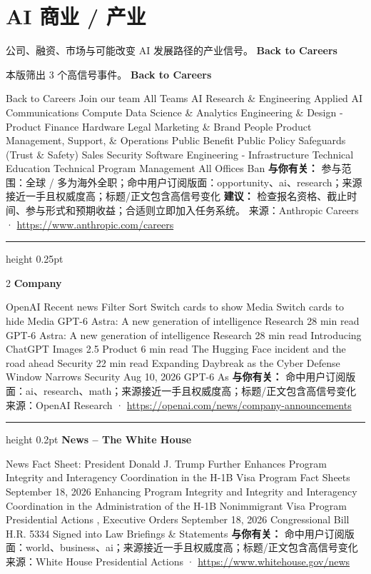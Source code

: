 \documentclass[10.5pt]{ctexart}
\begin{document}
\section*{AI 商业 / 产业}
{\color{ormuted} 公司、融资、市场与可能改变 AI 发展路径的产业信号。}
\vspace{2mm}
{\LARGE\bfseries Back to Careers}\par
\vspace{1mm}
{\color{ormuted} 本版筛出 3 个高信号事件。}
\vspace{3mm}
{\Large\bfseries Back to Careers}\par
Back to Careers Join our team All Teams AI Research \& Engineering Applied AI Communications Compute Data Science \& Analytics Engineering \& Design - Product Finance Hardware Legal Marketing \& Brand People Product Management, Support, \& Operations Public Benefit Public Policy Safeguards (Trust \& Safety) Sales Security Software Engineering - Infrastructure Technical Education Technical Program Management All Offices Ban
\textbf{与你有关：} 参与范围：全球 / 多为海外全职；命中用户订阅版面：opportunity、ai、research；来源接近一手且权威度高；标题/正文包含高信号变化
\textbf{建议：} 检查报名资格、截止时间、参与形式和预期收益；合适则立即加入任务系统。
{\footnotesize\color{ormuted} 来源：Anthropic Careers · \url{https://www.anthropic.com/careers}}
\vspace{4mm}
\hrule height 0.25pt
\vspace{3mm}
\begin{multicols}{2}
{\large\bfseries Company}\par
OpenAI Recent news Filter Sort Switch cards to show Media Switch cards to hide Media GPT-6 Astra: A new generation of intelligence Research 28 min read GPT-6 Astra: A new generation of intelligence Research 28 min read Introducing ChatGPT Images 2.5 Product 6 min read The Hugging Face incident and the road ahead Security 22 min read Expanding Daybreak as the Cyber Defense Window Narrows Security Aug 10, 2026 GPT-6 As
\textbf{与你有关：} 命中用户订阅版面：ai、research、math；来源接近一手且权威度高；标题/正文包含高信号变化
{\footnotesize\color{ormuted} 来源：OpenAI Research · \url{https://openai.com/news/company-announcements}}
\vspace{2mm}
\hrule height 0.2pt
\vspace{2mm}
{\large\bfseries News – The White House}\par
News Fact Sheet: President Donald J. Trump Further Enhances Program Integrity and Interagency Coordination in the H-1B Visa Program Fact Sheets September 18, 2026 Enhancing Program Integrity and Integrity and Interagency Coordination in the Administration of the H-1B Nonimmigrant Visa Program Presidential Actions , Executive Orders September 18, 2026 Congressional Bill H.R. 5334 Signed into Law Briefings \& Statements
\textbf{与你有关：} 命中用户订阅版面：world、business、ai；来源接近一手且权威度高；标题/正文包含高信号变化
{\footnotesize\color{ormuted} 来源：White House Presidential Actions · \url{https://www.whitehouse.gov/news}}
\end{multicols}
\end{document}
